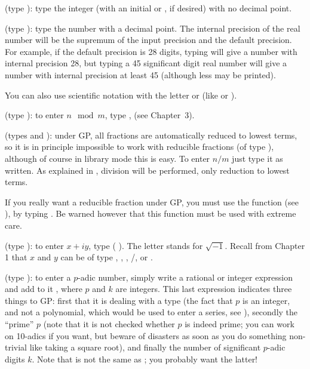  
(type ): type the integer (with an initial
\kbd{+} or \kbd{-}, if desired) with no decimal point.

 
(type ): type the number with a decimal
point. The internal precision of the real number will be the supremum of the
input precision and the default precision. For example, if the default
precision is 28 digits, typing  will give a number with internal
precision 28, but typing a 45 significant digit real number will give a
number with internal precision at least 45 (although less may be printed).

You can also use scientific notation with the letter  or
 (like  or ).

(type ): to enter $n \mod m$, type
,   (see Chapter~3).

(types  and ): under GP, all fractions are
automatically reduced to lowest terms, so it is in principle impossible to
work with reducible fractions (of type ), although of course in
library mode this is easy. To enter $n/m$ just type it as written. As
explained in , division will  be performed, only
reduction to lowest terms.\label{se:FRAC}

If you really want a reducible fraction under GP, you must use the 
function (see ), by typing . Be warned
however that this function must be used with extreme care.

(type ): to enter $x+iy$, type  (
). The letter  stands for $\sqrt{-1}$. Recall from
Chapter 1 that $x$ and $y$ can be of type , ,
, /, or .

\label{se:padic}
(type ): to enter a $p$-adic number, simply write a
rational or integer expression and add to it , where $p$
and $k$ are integers. This last expression indicates three things to GP:
first that it is dealing with a  type (the fact that $p$ is an
integer, and not a polynomial, which would be used to enter a series, see
), secondly the ``prime'' $p$ (note that it is not
checked whether $p$ is indeed prime; you can work on 10-adics if you want, but
beware of disasters as soon as you do something non-trivial like taking a
square root), and finally the number of significant $p$-adic digits $k$.
Note that  is not the same as ; you probably
want the latter!

